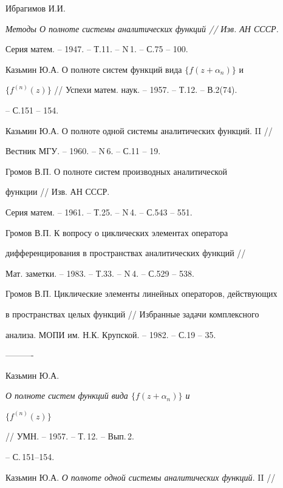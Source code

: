 Ибрагимов И.И. {\em Методы О полноте системы аналитических функций // Изв. АН СССР.


Серия матем. -- 1947. -- Т.11. -- N\,1. -- С.75 -- 100.




Казьмин Ю.А. О полноте систем функций вида $\{f(z+\alpha_n)\}$ и


$\{f^{(n)}(z)\}$ // Успехи матем. наук. -- 1957. -- Т.12. -- В.2(74).


 -- С.151 -- 154.




Казьмин Ю.А. О полноте одной системы аналитических функций. II //


Вестник МГУ. -- 1960. -- N\,6. -- С.11 -- 19.




Громов В.П. О полноте систем производных аналитической


функции // Изв. АН СССР.


Серия матем. -- 1961. -- Т.25. -- N\,4. -- С.543 -- 551.




Громов В.П. К вопросу о циклических элементах оператора


дифференцирования в пространствах аналитических функций //


Мат. заметки. -- 1983. -- Т.33. -- N\,4. -- С.529 -- 538.




Громов В.П. Циклические элементы линейных операторов, действующих


в пространствах целых функций // Избранные задачи комплексного


анализа. МОПИ им. Н.К. Крупской. -- 1982. -- С.19 -- 35.








----------







Казьмин Ю.А. {\em О полноте систем функций вида $\{f(z+\alpha_n)\}$ и


$\{f^{(n)}(z)\}$} // УМН. -- 1957. -- Т.\,12. -- Вып.\,2.


-- С.\,151--154.




Казьмин Ю.А. {\em О полноте одной системы аналитических функций}. II //


}
